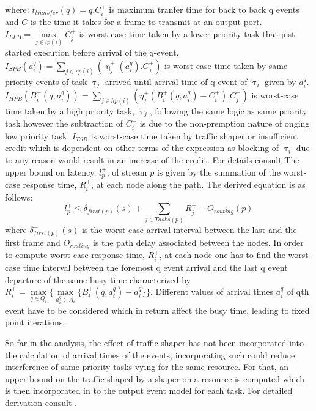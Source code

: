 \documentclass[journal,12pt,twocolumn]{IEEEtran}
\begin{document}
where: $t_{transfer}(q) = q.C_i^+$ is maximum tranfer time for back to back q events and $C$ is the time it takes for a frame to transmit at an output port. $I_{LPB}=\max\limits_{j\in lp(i)} C_j^+$ is worst-case time taken by a lower priority task that just started execution before arrival of the q-event. $I_{SPB}(a_i^q)=\sum\limits_{j\in sp(i)} (\upeta_j^+(a_i^q).C_j^+)$ is worst-case time taken by same priority events of task $\uptau_j$ arrived until arrival time of q-event of $\uptau_i$ given by $a_i^q$. $I_{HPB}(B_i^+(q,a_i^q))=\sum\limits_{j\in hp(i)} (\eta_j^+(B_i^+(q,a_i^q)-C_i^+).C_j^+)$ is worst-case time taken by a high priority task, $\uptau_j$, following the same logic as same priority task however the subtraction of $C_i^+$ is due to the non-premption nature of onging low priority task, $I_{TSB}$ is worst-case time taken by traffic shaper or insufficient credit which is dependent on other terms of the expression as blocking of $\uptau_i$ due to any reason would result in an increase of the credit. For details consult \cite{CPA}
The upper bound on latency, $l_{p}^+$, of stream $p$ is given by the summation of the worst-case response time, $R_i^+$, at each node along the path. The derived equation is as follows:
\begin{equation*}
l_p^+ \leq \delta^-_{first(p)}(s) + \sum_{j \in Tasks(p)} R_j^++ O_{routing}(p)
\end{equation*}
where $ \delta^-_{first(p)}(s)$ is the worst-case arrival interval between the last and the first frame and $O_{routing}$ is the path delay associated between the nodes. In order to compute worst-case response time, $R_i^+$, at each node one has to find the worst-case time interval between the foremost q event arrival and the last q event departure of the same busy time characterized by $R_i^+=\max\limits_{q\in Q_i}\big\{ \max\limits_{a_i^q\in A_i}\{B_i^+(q,a_i^q)-a_i^q\}\big\}$. Different values of arrival times $a_i^q$ of qth event have to be considered which in return affect the busy time, leading to fixed point iterations.

So far in the analysis, the effect of traffic shaper has not been incorporated into the calculation of arrival times of the events, incorporating such could reduce interference of same priority tasks vying for the same resource. For that, an upper bound on the traffic shaped by a shaper on a resource is computed which is then incorporated in to the output event model for each task. For detailed derivation consult \cite{CPA}.
\end{document}
